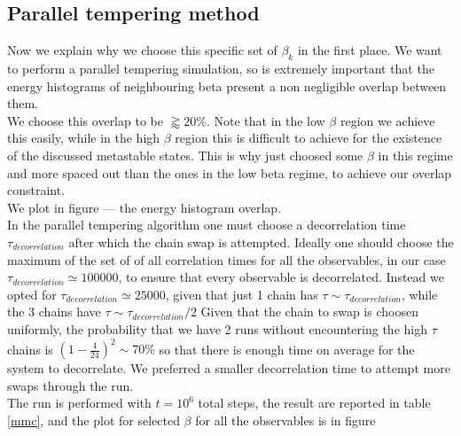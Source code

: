 \subsection{Parallel tempering method}
Now we explain why we choose this specific set of $\beta_k$ in the first place. We want to perform a parallel tempering simulation, so is 
extremely important that the energy histograms of neighbouring beta present a non negligible overlap \cite{Marinari-1992} between them. \\
We choose this overlap to be $\gtrapprox 20 \%$. Note that in the low $\beta$ region we achieve this easily, while in the high $\beta$ region 
this is difficult to achieve for the existence of the discussed metastable states. This is why just choosed some $\beta$ in this regime and more 
spaced out than the ones in the low beta regime, to achieve our overlap constraint. \\
We plot in figure --- the energy histogram overlap. \\

In the parallel tempering algorithm one must choose a decorrelation time $\tau_{decorrelation}$ after which the chain swap is attempted.
Ideally one should choose the maximum of the set of of all correlation times for all the observables, in our case $\tau_{decorrelation} \simeq 100000$, to ensure that 
every observable is decorrelated. Instead we opted for $\tau_{decorrelation} \simeq 25000$, given that just 1 chain has $\tau \sim \tau_{decorrelation}$, while the 3 chains have $\tau \sim \tau_{decorrelation}/2$ 
Given that the chain to swap is choosen uniformly, the probability that we have 2 runs without encountering the high $\tau$ chains is $\left(1-\frac{4}{24}\right)^2 \sim 70 \% $ 
so that there is enough time on average for the system to decorrelate.
We preferred a smaller decorrelation time to attempt more swaps through the run. \\
The run is performed with $t = 10^6$ total steps, the result are reported in table \ref{mmc}, and the plot for selected $\beta$ for all the observables is in figure \\

